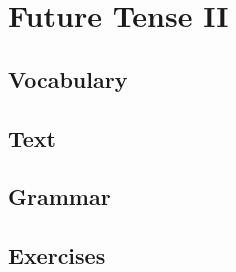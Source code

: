 \chapter{Future Tense II}
\section*{Vocabulary}
\section*{Text}
\section*{Grammar}
\section*{Exercises}
